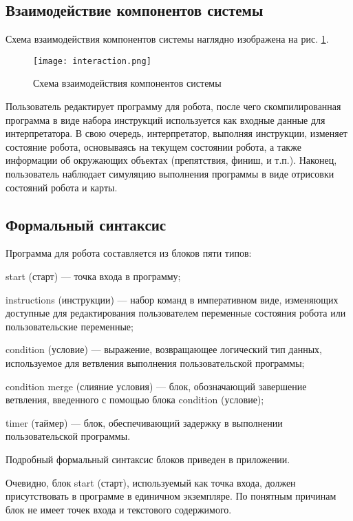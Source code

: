 \subsection{Взаимодействие компонентов системы}

Схема взаимодействия компонентов системы наглядно изображена на рис. \ref{fig:interaction}.

\begin{figure}[htbp]
	\centering
	\texttt{[image: interaction.png]}
	\caption{Схема взаимодействия компонентов системы}%
	\label{fig:interaction}
\end{figure}

Пользователь редактирует программу для робота, после чего скомпилированная программа в виде набора инструкций используется как входные данные для интерпретатора. В свою очередь, интерпретатор, выполняя инструкции, изменяет состояние робота, основываясь на текущем состоянии робота, а также информации об окружающих объектах (препятствия, финиш, и т.п.). Наконец, пользователь наблюдает симуляцию выполнения программы в виде отрисовки состояний робота и карты. 

\subsection{Формальный синтаксис}
Программа для робота составляется из блоков пяти типов:
\begin{itemize*}
	\item start (старт) — точка входа в программу;
	\item instructions (инструкции) — набор команд в императивном виде, изменяющих доступные для редактирования пользователем переменные состояния робота или пользовательские переменные;
	\item condition (условие) — выражение, возвращающее логический тип данных, используемое для ветвления выполнения пользовательской программы;
	\item condition merge (слияние условия) — блок, обозначающий завершение ветвления, введенного с помощью блока condition (условие);
	\item timer (таймер) — блок, обеспечивающий задержку в выполнении пользовательской программы.
\end{itemize*}

Подробный формальный синтаксис блоков приведен в приложении.

Очевидно, блок start (старт), используемый как точка входа, должен присутствовать в программе в единичном экземпляре. По понятным причинам блок не имеет точек входа и текстового содержимого.

